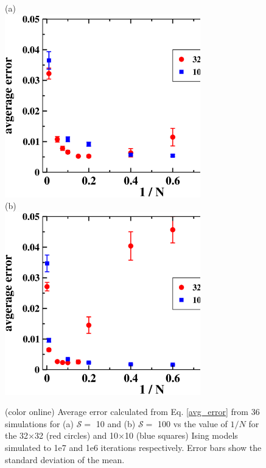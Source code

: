 \documentclass[aps,pre,reprint,superscriptaddress,showkeys]{revtex4-2}
\begin{document}
\begin{figure}[h!]
(a)\\
\includegraphics[width=8.5cm]{fig2a.eps}\\
(b)\\
\includegraphics[width=8.5cm]{fig2b.eps}\\

\caption{(color online) Average error calculated from Eq. \ref{avg_error} from 36 simulations for (a) $\mathcal{S}=$ 10 and (b) $\mathcal{S}=$ 100   vs the value of $1/N$ for the 32$\times$32 (red circles) and 10$\times$10 (blue squares) Ising models simulated to 1e7 and 1e6 iterations respectively.  Error bars show the standard deviation of the mean. \label{N_dependence}}
\end{figure}
\end{document}
